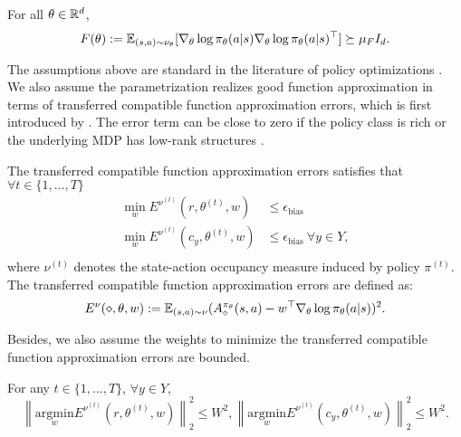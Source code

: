 \begin{assumption}\label{Assumption_PSD_Fisher}
    For all $\theta\in{\mathbb R}^d$,
    $$F(\theta):={\mathbb E}_{(s,a)\sim\nu_\theta}[\nabla_\theta\log\pi_\theta(a|s)\nabla_\theta\log\pi_\theta(a|s)^\top]\succeq\mu_F I_d.
    $$
\end{assumption}
The assumptions above are standard in the literature of policy optimizations \citep{agarwal2021theory}.
We also assume the parametrization realizes good function approximation in terms of transferred compatible function approximation errors, which is first introduced by \cite{agarwal2021theory}.
The error term can be close to zero if the policy class is rich \citep{wang2019neural} or the underlying MDP has low-rank structures \citep{jiang2017contextual}.
\begin{assumption}\label{Assumption_func_approx_err}
The transferred compatible function approximation errors satisfies that $\forall t\in\{1,...,T\}$
$$
\begin{aligned}
\min_w E^{\nu^{(t)}}(r,\theta^{(t)},w)&\leq \epsilon_{\text{bias}}\\
\min_w E^{\nu^{(t)}}(c_y,\theta^{(t)},w)&\leq \epsilon_{\text{bias}}\ \forall y\in Y,\\
\end{aligned}
$$
where $\nu^{(t)}$ denotes the state-action occupancy measure induced by policy $\pi^{(t)}$. 
The transferred compatible function approximation errors are defined as:
$$
E^{\nu}(\diamond,\theta,w):={\mathbb E}_{(s,a)\sim\nu}(A^{\pi_\theta}_\diamond(s,a)-w^\top\nabla_\theta\log\pi_\theta(a|s))^2.
$$
\end{assumption}

Besides, we also assume the weights to minimize the transferred compatible function approximation errors are bounded.

\begin{assumption}\label{Assumption_est_err}
For any $t\in\{1,...,T\}$, $\forall y\in Y$,
$$
\left\|\underset{w}{\mathrm{argmin}} E^{\nu^{(t)}}(r,\theta^{(t)},w)\right\|_2^2\leq W^2, \left\|\underset{w}{\mathrm{argmin}} E^{\nu^{(t)}}(c_y,\theta^{(t)},w)\right\|_2^2\leq W^2.
$$
\end{assumption}


